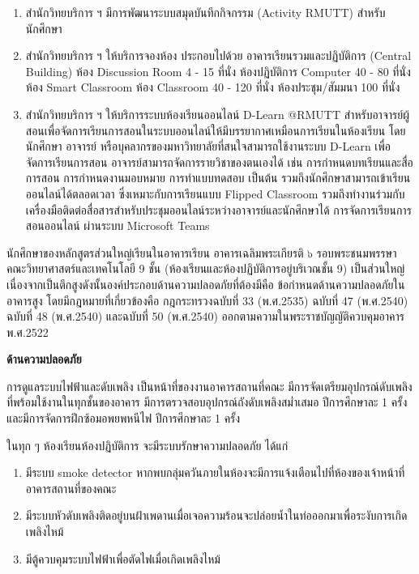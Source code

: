 \begin{enumerate}
\item สำนักวิทยบริการ ฯ มีการพัฒนาระบบสมุดบันทึกกิจกรรม (Activity RMUTT) สำหรับนักศึกษา
\item สำนักวิทยบริการ ฯ ให้บริการจองห้อง ประกอบไปด้วย อาคารเรียนรวมและปฏิบัติการ (Central Building)  ห้อง Discussion Room 4 - 15 ที่นั่ง ห้องปฏิบัติการ Computer 40 - 80 ที่นั่ง  ห้อง Smart Classroom ห้อง Classroom 40 - 120 ที่นั่ง  ห้องประชุม/สัมมนา 100 ที่นั่ง
\item สำนักวิทยบริการ ฯ ให้บริการระบบห้องเรียนออนไลน์ D-Learn @RMUTT สำหรับอาจารย์ผู้สอนเพื่อจัดการเรียนการสอนในระบบออนไลน์ให้มีบรรยากาศเหมือนการเรียนในห้องเรียน โดยนักศึกษา อาจารย์ หรือบุคลากรของมหาวิทยาลัยที่สนใจสามารถใช้งานระบบ D-Learn เพื่อจัดการเรียนการสอน อาจารย์สามารถจัดการรายวิชาของตนเองได้ เช่น การกำหนดบทเรียนและสื่อการสอน การกำหนดงานมอบหมาย การทำแบบทดสอบ เป็นต้น รวมถึงนักศึกษาสามารถเข้าเรียนออนไลน์ได้ตลอดเวลา ซึ่งเหมาะกับการเรียนแบบ Flipped Classroom รวมถึงทำงานร่วมกับเครื่องมือติดต่อสื่อสารสำหรับประชุมออนไลน์ระหว่างอาจารย์และนักศึกษาได้   การจัดการเรียนการสอนออนไลน์ ผ่านระบบ Microsoft Teams
\end{enumerate}

\begin{doclist}
\end{doclist}



นักศึกษาของหลักสูตรส่วนใหญ่เรียนในอาคารเรียน อาคารเฉลิมพระเกียรติ ๖ รอบพระชนมพรรษา คณะวิทยาศาสตร์และเทคโนโลยี 9 ชั้น  (ห้องเรียนและห้องปฏิบัติการอยู่บริเวณชั้น 9) เป็นส่วนใหญ่  เนื่องจากเป็นตึกสูงดังนั้นองค์ประกอบด้านความปลอดภัยที่ต้องมีคือ ข้อกำหนดด้านความปลอดภัยในอาคารสูง โดยมีกฎหมายที่เกี่ยวข้องคือ
กฎกระทรวงฉบับที่ 33 (พ.ศ.2535) ฉบับที่ 47 (พ.ศ.2540) ฉบับที่ 48 (พ.ศ.2540) และฉบับที่ 50 (พ.ศ.2540) ออกตามความในพระราชบัญญัติควบคุมอาคาร พ.ศ.2522

{\bf ด้านความปลอดภัย}

การดูแลระบบไฟฟ้าและดับเพลิง เป็นหน้าที่ของงานอาคารสถานที่คณะ มีการจัดเตรียมอุปกรณ์ดับเพลิงที่พร้อมใช้งานในทุกชั้นของอาคาร มีการตรวจสอบอุปกรณ์ถังดับเพลิงสม่ำเสมอ ปีการศึกษาละ 1 ครั้งและมีการจัดการฝึกซ้อมอพยพหนีไฟ ปีการศึกษาละ 1 ครั้ง

ในทุก ๆ ห้องเรียนห้องปฏิบัติการ จะมีระบบรักษาความปลอดภัย ได้แก่
\begin{enumerate}
	\item มีระบบ smoke detector หากพบกลุ่มควันภายในห้องจะมีการแจ้งเตือนไปที่ห้องของเจ้าหน้าที่อาคารสถานที่ของคณะ
	\item มีระบบหัวดับเพลิงติดอยู่บนฝ้าเพดานเมื่อเจอความร้อนจะปล่อยน้ำในท่อออกมาเพื่อระงับการเกิดเพลิงไหม้
	\item มีตู้ควบคุมระบบไฟฟ้าเพื่อตัดไฟเมื่อเกิดเพลิงไหม้
\end{enumerate}

